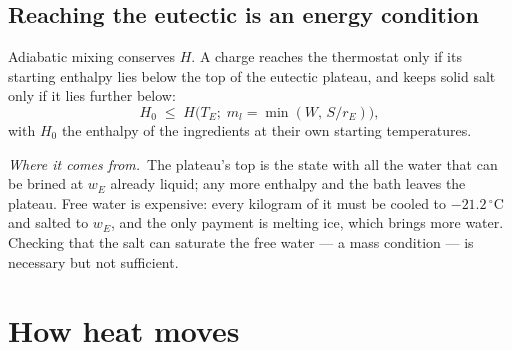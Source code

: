 \documentclass[11pt,a4paper]{article}
\newcommand{\dC}{\,^{\circ}\mathrm{C}}
\newcommand{\where}{\par\noindent\textit{Where it comes from.}\ }
\begin{document}
\subsection{Reaching the eutectic is an energy condition}
\label{sec:reach}
Adiabatic mixing conserves $H$. A charge reaches the thermostat only if its starting enthalpy lies
below the top of the eutectic plateau, and keeps solid salt only if it lies further below:
\begin{equation}
H_0 \;\le\; H\big(T_E;\; m_l = \min(W,\,S/r_E)\big),
\label{eq:reach}
\end{equation}
with $H_0$ the enthalpy of the ingredients at their own starting temperatures. \where The plateau's top
is the state with all the water that can be brined at $w_E$ already liquid; any more enthalpy and the
bath leaves the plateau. Free water is expensive: every kilogram of it must be cooled to $-21.2\dC$ and
salted to $w_E$, and the only payment is melting ice, which brings more water. Checking that the
salt can saturate the free water — a mass condition — is necessary but not sufficient.

\section{How heat moves}
\label{sec:heat}
\end{document}
